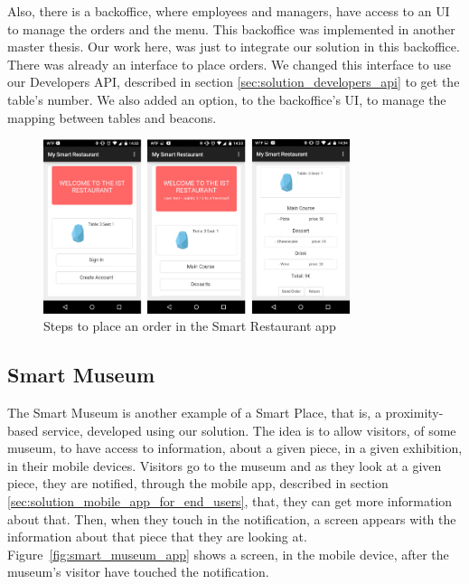 Also, there is a backoffice, where employees and managers, have access to an \gls{UI} to manage the orders and the menu.
This backoffice was implemented in another master thesis\cite{SLOC}.
Our work here, was just to integrate our solution in this backoffice.
There was already an interface to place orders.
We changed this interface to use our Developers \gls{API}, described in section \ref{sec:solution_developers_api} to get the table's number.
We also added an option, to the backoffice's \gls{UI}, to manage the mapping between tables and beacons.

\begin{figure}[!ht]
  \centering
    \includegraphics[width=0.8\textwidth, keepaspectratio]{images/screenshots/smart_restaurant_app}
    \caption{Steps to place an order in the Smart Restaurant app}
    \label{fig:smart_restaurant_app}
\end{figure}

\subsection{Smart Museum}
\label{sub:smart_museum}
The Smart Museum is another example of a Smart Place, that is, a proximity-based service, developed using our solution.
The idea is to allow visitors, of some museum, to have access to information, about a given piece, in a given exhibition, in their mobile devices.
Visitors go to the museum and as they look at a given piece, they are notified, through the mobile app, described in section \ref{sec:solution_mobile_app_for_end_users}, that, they can get more information about that.
Then, when they touch in the notification, a screen appears with the information about that piece that they are looking at.
Figure~\ref{fig:smart_museum_app} shows a screen, in the mobile device, after the museum's visitor have touched the notification.

